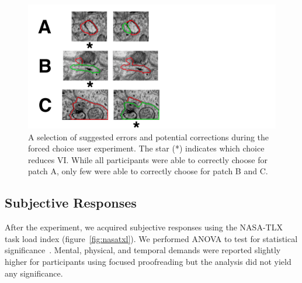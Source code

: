 \begin{figure}[t]
\centering
\includegraphics[width=\linewidth]{gfx/patches.pdf}
\caption{A selection of suggested errors and potential corrections during the forced choice user experiment. The star (*) indicates which choice reduces VI. While all participants were able to correctly choose for patch A, only few were able to correctly choose for patch B and C.}
\label{fig:patches}
\end{figure}

\subsection{Subjective Responses}

After the experiment, we acquired subjective responses using the NASA-TLX task load index (figure~\ref{fig:nasatxl}). We performed ANOVA to test for statistical significance~\cite{shaffer1995}. Mental, physical, and temporal demands were reported slightly higher for participants using focused proofreading but the analysis did not yield any significance.


